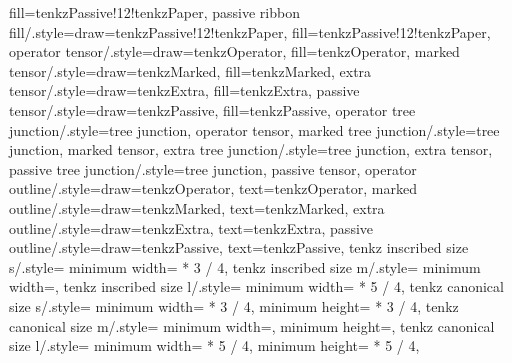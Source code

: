 {{      fill=tenkzPassive!12!tenkzPaper},
  passive ribbon fill/.style={draw=tenkzPassive!12!tenkzPaper,
      fill=tenkzPassive!12!tenkzPaper},
  operator tensor/.style={draw=tenkzOperator, fill=tenkzOperator},
  marked tensor/.style={draw=tenkzMarked, fill=tenkzMarked},
  extra tensor/.style={draw=tenkzExtra, fill=tenkzExtra},
  passive tensor/.style={draw=tenkzPassive, fill=tenkzPassive},
  operator tree junction/.style={tree junction, operator tensor},
  marked tree junction/.style={tree junction, marked tensor},
  extra tree junction/.style={tree junction, extra tensor},
  passive tree junction/.style={tree junction, passive tensor},
  operator outline/.style={draw=tenkzOperator, text=tenkzOperator},
  marked outline/.style={draw=tenkzMarked, text=tenkzMarked},
  extra outline/.style={draw=tenkzExtra, text=tenkzExtra},
  passive outline/.style={draw=tenkzPassive, text=tenkzPassive},
  tenkz inscribed size s/.style={
      minimum width=\dimexpr
        \tenkz@r@glyphref\tenkz@pitch * 3 / 4\relax},
  tenkz inscribed size m/.style={
      minimum width=\tenkz@dim{\tenkz@r@glyphref}},
  tenkz inscribed size l/.style={
      minimum width=\dimexpr
        \tenkz@r@glyphref\tenkz@pitch * 5 / 4\relax},
  tenkz canonical size s/.style={
      minimum width=\dimexpr
        \tenkz@r@glyphref\tenkz@pitch * 3 / 4\relax,
      minimum height=\dimexpr
        \tenkz@r@glyphref\tenkz@pitch * 3 / 4\relax},
  tenkz canonical size m/.style={
      minimum width=\tenkz@dim{\tenkz@r@glyphref},
      minimum height=\tenkz@dim{\tenkz@r@glyphref}},
  tenkz canonical size l/.style={
      minimum width=\dimexpr
        \tenkz@r@glyphref\tenkz@pitch * 5 / 4\relax,
      minimum height=\dimexpr
        \tenkz@r@glyphref\tenkz@pitch * 5 / 4\relax},
}
